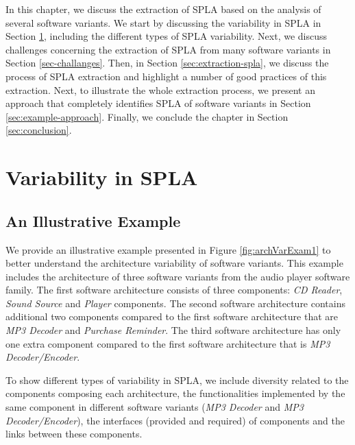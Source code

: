 \documentclass[graybox]{svmult}
\begin{document}
In this chapter, we discuss the extraction of SPLA based on the analysis of several software variants. 
We start by discussing the variability in SPLA in Section \ref{sec:variability-spla}, including the different types of SPLA variability. 
Next, we discuss challenges concerning the extraction of SPLA from many software variants in Section \ref{sec-challanges}. 
Then, in Section \ref{sec:extraction-spla}, we discuss the process of SPLA extraction and highlight a number of good practices of this extraction. Next, to illustrate the whole extraction process, we present an approach that completely identifies SPLA of software variants in Section \ref{sec:example-approach}. Finally, we conclude the chapter in Section \ref{sec:conclusion}.

\section{Variability in SPLA}
\label{sec:variability-spla}

\subsection{An Illustrative Example}

We provide an illustrative example presented in Figure \ref{fig:archVarExam1} to better understand the architecture variability of software variants. This example includes the architecture of three software variants from the audio player software family.
The first software architecture consists of three components: \textit{CD Reader}, \textit{Sound Source} and \textit{Player} components. The second software architecture contains additional two components compared to the first software architecture that are \textit{MP3 Decoder} and \textit{Purchase Reminder}. The third software architecture has only one extra component compared to the first software architecture that is \textit{MP3 Decoder/Encoder}. 

To show different types of variability in SPLA, we include diversity related to the components composing each architecture, the functionalities implemented by the same component in different software variants (\textit{MP3 Decoder} and \textit{MP3 Decoder/Encoder}), the interfaces (provided and required) of components and the links between these components.
\end{document}
